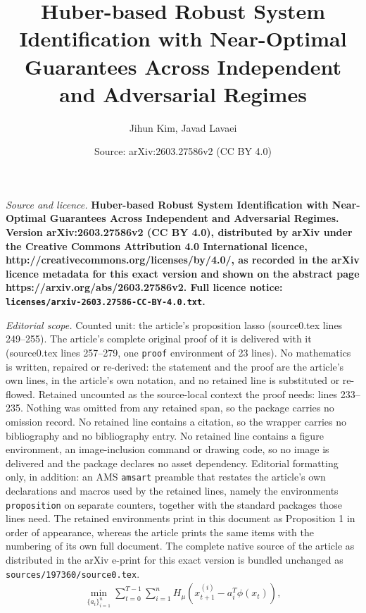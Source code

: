 \documentclass[10pt,a4paper]{amsart}
\title{\fontsize{15.6}{19.5}\selectfont \bf Huber-based Robust System Identification with Near-Optimal Guarantees Across Independent and Adversarial Regimes}
\author{Jihun Kim, Javad Lavaei}
\date{Source: arXiv:2603.27586v2 (CC BY 4.0)}
\begin{document}
\maketitle

\noindent\emph{Source and licence.} \fontsize{15.6}{19.5}\selectfont \bf Huber-based Robust System Identification with Near-Optimal Guarantees Across Independent and Adversarial Regimes. Version arXiv:2603.27586v2 (CC BY 4.0), distributed by arXiv under the Creative Commons Attribution 4.0 International licence, http://creativecommons.org/licenses/by/4.0/, as recorded in the arXiv licence metadata for this exact version and shown on the abstract page https://arxiv.org/abs/2603.27586v2. Full licence notice: \texttt{licenses/arxiv-2603.27586-CC-BY-4.0.txt}.\par\smallskip

\noindent\textit{Editorial scope.} Counted unit: the article's proposition lasso (source0.tex lines 249--255). The article's complete original proof of it is delivered with it (source0.tex lines 257--279, one \texttt{proof} environment of 23 lines). No mathematics is written, repaired or re-derived: the statement and the proof are the article's own lines, in the article's own notation, and no retained line is substituted or re-flowed.  Retained uncounted as the source-local context the proof needs: lines 233--235.  Nothing was omitted from any retained span, so the package carries no omission record.  No retained line contains a citation, so the wrapper carries no bibliography and no bibliography entry.  No retained line contains a figure environment, an image-inclusion command or drawing code, so no image is delivered and the package declares no asset dependency.  Editorial formatting only, in addition: an AMS \texttt{amsart} preamble that restates the article's own declarations and macros used by the retained lines, namely the environments \texttt{proposition} on separate counters, together with the standard packages those lines need.  The retained environments print in this document as Proposition 1 in order of appearance, whereas the article prints the same items with the numbering of its own full document.  The complete native source of the article as distributed in the arXiv e-print for this exact version is bundled unchanged as \texttt{sources/197360/source0.tex}.
\begin{align}\tag{Huber estimator}  \label{hubermin}
    \min_{\{a_i\}_{i=1}^n} \sum_{t=0}^{T-1} \sum_{i=1}^n H_{\mu} (x_{t+1}^{(i)} - a_i^T \phi(x_t)), 
\end{align}
\end{document}
